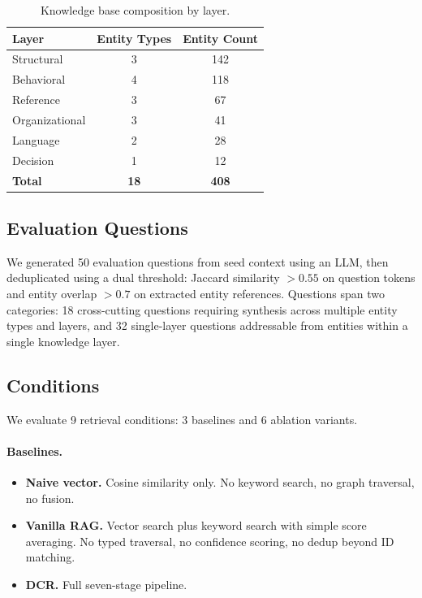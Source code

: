 \documentclass[11pt,a4paper]{article}
\begin{document}
\begin{table}[h]
\centering
\caption{Knowledge base composition by layer.}
\label{tab:kb-stats}
\begin{tabular}{@{}lcc@{}}
\toprule
Layer & Entity Types & Entity Count \\
\midrule
Structural & 3 & 142 \\
Behavioral & 4 & 118 \\
Reference & 3 & 67 \\
Organizational & 3 & 41 \\
Language & 2 & 28 \\
Decision & 1 & 12 \\
\midrule
\textbf{Total} & \textbf{18} & \textbf{408} \\
\bottomrule
\end{tabular}
\end{table}

\subsection{Evaluation Questions}

We generated 50 evaluation questions from seed context using an LLM, then deduplicated using a dual threshold: Jaccard similarity $> 0.55$ on question tokens and entity overlap $> 0.7$ on extracted entity references. Questions span two categories: 18 cross-cutting questions requiring synthesis across multiple entity types and layers, and 32 single-layer questions addressable from entities within a single knowledge layer.

\subsection{Conditions}

We evaluate 9 retrieval conditions: 3 baselines and 6 ablation variants.

\paragraph{Baselines.}
\begin{itemize}[nosep]
  \item \textbf{Naive vector.} Cosine similarity only. No keyword search, no graph traversal, no fusion.
  \item \textbf{Vanilla RAG.} Vector search plus keyword search with simple score averaging. No typed traversal, no confidence scoring, no dedup beyond ID matching.
  \item \textbf{DCR.} Full seven-stage pipeline.
\end{itemize}
\end{document}
